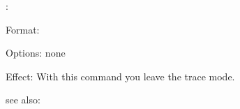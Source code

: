 \nospy:

Format: 

Options: none

Effect: With this \RELFUN{} command you leave the trace mode.

see also: \spy
